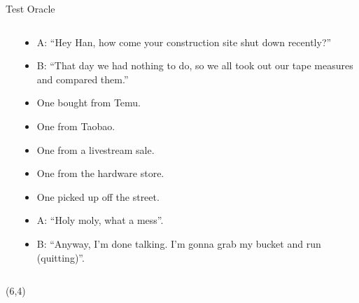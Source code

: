 \documentclass{beamer}
\begin{document}
\begin{frame}[t]{Test Oracle}
\begin{columns}
\begin{column}{0.3\textwidth}
        \end{column}
        \begin{column}{0.5\textwidth}
            \scriptsize
            \begin{itemize}
                \item A: ``Hey Han, how come your construction site shut down recently?''
                \item B: ``That day we had nothing to do, so we all took out our tape measures and compared them.''
                \item One bought from Temu.
                \item One from Taobao.
                \item One from a livestream sale.
                \item One from the hardware store.
                \item One picked up off the street.
                \item A: ``Holy moly, what a mess''.
                \item B: ``Anyway, I'm done talking. I'm gonna grab my bucket and run (quitting)''. 
            \end{itemize}
        \end{column}
    \end{columns}
    \begin{textblock}{4}(6,4)
    \end{textblock}
\end{frame}
\end{document}
